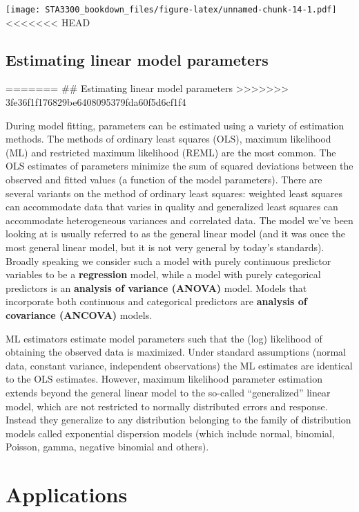 \documentclass[
]{book}
\begin{document}
\texttt{[image: STA3300\_bookdown\_files/figure-latex/unnamed-chunk-14-1.pdf]}
<<<<<<< HEAD

\hypertarget{estimating-linear-model-parameters}{%
\section{Estimating linear model parameters}\label{estimating-linear-model-parameters}}
=======
\#\# Estimating linear model parameters
>>>>>>> 3fe36f1f176829be6408095379fda60f5d6cf1f4

During model fitting, parameters can be estimated using a variety of estimation methods. The methods of ordinary least squares (OLS), maximum likelihood (ML) and restricted maximum likelihood (REML) are the most common. The OLS estimates of parameters minimize the sum of squared deviations between the observed and fitted values (a function of the model parameters). There are several variants on the method of ordinary least squares: weighted least squares can accommodate data that varies in quality and generalized least squares can accommodate heterogeneous variances and correlated data. The model we've been looking at is usually referred to as the general linear model (and it was once the most general linear model, but it is not very general by today's standards). Broadly speaking we consider such a model with purely continuous predictor variables to be a \textbf{regression} model, while a model with purely categorical predictors is an \textbf{analysis of variance (ANOVA)} model. Models that incorporate both continuous and categorical predictors are \textbf{analysis of covariance (ANCOVA)} models.

ML estimators estimate model parameters such that the (log) likelihood of obtaining the observed data is maximized. Under standard assumptions (normal data, constant variance, independent observations) the ML estimates are identical to the OLS estimates. However, maximum likelihood parameter estimation extends beyond the general linear model to the so-called ``generalized'' linear model, which are not restricted to normally distributed errors and response. Instead they generalize to any distribution belonging to the family of distribution models called exponential dispersion models (which include normal, binomial, Poisson, gamma, negative binomial and others).

\hypertarget{applications}{%
\chapter{Applications}\label{applications}}
\end{document}
